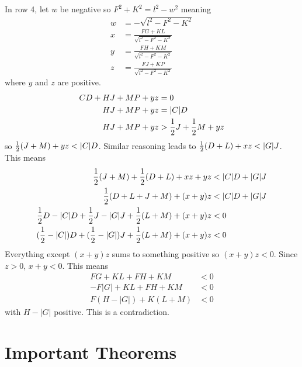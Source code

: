 In row 4, let $w$ be negative so $F^2+K^2=l^2-w^2$ meaning
\begin{align*}
w &= -\sqrt{l^2-F^2-K^2}              \\
x &= \frac{FG+KL}{\sqrt{l^2-F^2-K^2}} \\
y &= \frac{FH+KM}{\sqrt{l^2-F^2-K^2}} \\
z &= \frac{FJ+KP}{\sqrt{l^2-F^2-K^2}}
\end{align*}
where $y$ and $z$ are positive.
\begin{align*}
CD+HJ+MP+yz &= 0    \\
   HJ+MP+yz &= |C|D \\
   HJ+MP+yz &> \frac{1}{2} J+\frac{1}{2} M+yz
\end{align*}
so $\frac{1}{2}(J+M)+yz < |C|D$.  Similar reasoning leads to
$\frac{1}{2}(D+L)+xz < |G|J$.  This means
\begin{align*}
                      \frac{1}{2}(J+M)+\frac{1}{2}(D+L)+xz+yz &< |C|D+|G|J \\
                                  \frac{1}{2}(D+L+J+M)+(x+y)z &< |C|D+|G|J \\
  \frac{1}{2} D-|C|D+\frac{1}{2} J-|G|J+\frac{1}{2}(L+M)+(x+y)z &< 0         \\
(\frac{1}{2}-|C|)D+(\frac{1}{2}-|G|)J+\frac{1}{2}(L+M)+(x+y)z &< 0
\end{align*}
Everything except $(x+y)z$ sums to something positive so $(x+y)z < 0$.  Since
$z > 0$, $x+y < 0$.  This means
\begin{align*}
   F G +KL+FH+KM &< 0 \\
  -F|G|+KL+FH+KM &< 0 \\
 F(H-|G|)+K(L+M) &< 0
\end{align*}
with $H-|G|$ positive.  This is a contradiction.

\section*{Important Theorems}

